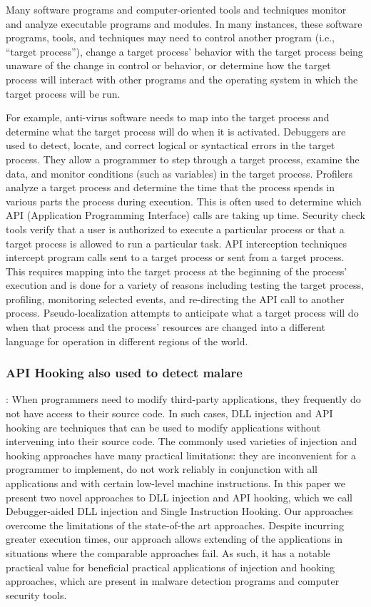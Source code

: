 \documentclass{article}
\begin{document}
Many software programs and computer-oriented tools and techniques monitor and analyze executable programs and modules. In many instances, these software programs, tools, and techniques may need to control another program (i.e., “target process”), change a target process' behavior with the target process being unaware of the change in control or behavior, or determine how the target process will interact with other programs and the operating system in which the target process will be run.

For example, anti-virus software needs to map into the target process and determine what the target process will do when it is activated. Debuggers are used to detect, locate, and correct logical or syntactical errors in the target process. They allow a programmer to step through a target process, examine the data, and monitor conditions (such as variables) in the target process. Profilers analyze a target process and determine the time that the process spends in various parts the process during execution. This is often used to determine which API (Application Programming Interface) calls are taking up time. Security check tools verify that a user is authorized to execute a particular process or that a target process is allowed to run a particular task. API interception techniques intercept program calls sent to a target process or sent from a target process. This requires mapping into the target process at the beginning of the process' execution and is done for a variety of reasons including testing the target process, profiling, monitoring selected events, and re-directing the API call to another process. Pseudo-localization attempts to anticipate what a target process will do when that process and the process' resources are changed into a different language for operation in different regions of the world.

\subsubsection{\textcite{Berdajs:2010} API Hooking also used to detect malare}
\textbf{}: When programmers need to modify third-party applications, they frequently do not have access to their source code. In such cases, DLL injection and API hooking are techniques that can be used to modify applications without intervening into their source code. The commonly used varieties of injection and hooking approaches have many practical limitations: they are inconvenient for a programmer to implement, do not work reliably in conjunction with all applications and with certain low-level machine instructions. In this paper we present two novel approaches to DLL injection and API hooking, which we call Debugger-aided DLL injection and Single Instruction Hooking. Our approaches overcome the limitations of the state-of-the art approaches. Despite incurring greater execution times, our approach allows extending of the applications in situations where the comparable approaches fail. As such, it has a notable practical value for beneficial practical applications of injection and hooking approaches, which are present in malware detection programs and computer security tools.
\end{document}
